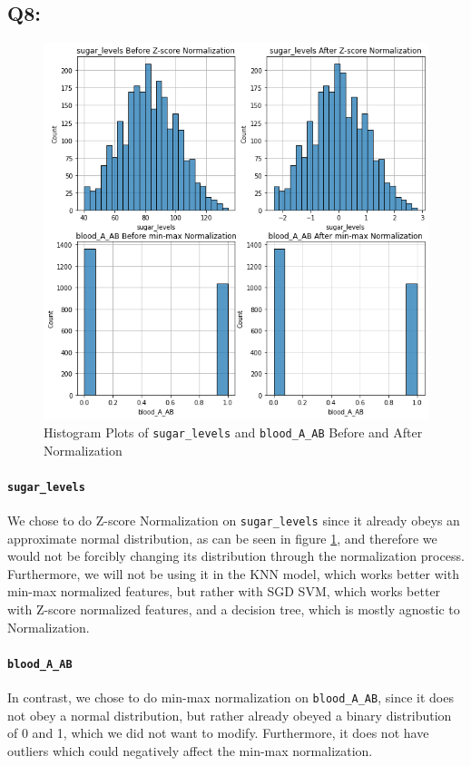 \documentclass{article}
\newcommand{\code}[1]{\texttt{#1}}
\begin{document}
\subsection*{Q8:}
    \begin{figure}[H]
        \centering
        \includegraphics[scale=0.5]{q8_hists.png}
        \caption{Histogram Plots of \code{sugar\_levels} and \code{blood\_A\_AB} Before and After Normalization}
        \label{fig:q8_hist}
    \end{figure}
    \paragraph*{\code{sugar\_levels}}
    We chose to do Z-score Normalization on \code{sugar\_levels} since it already obeys an approximate normal distribution, as can be seen in figure \ref{fig:q8_hist}, and therefore we would not be forcibly changing its distribution through the normalization process. Furthermore, we will not be using it in the KNN model, which works better with  min-max normalized features, but rather with SGD SVM, which works better with Z-score normalized features, and a decision tree, which is mostly agnostic to Normalization.
    \paragraph*{\code{blood\_A\_AB}}
     In contrast, we chose to do min-max normalization on \code{blood\_A\_AB}, since it does not obey a normal distribution, but rather already obeyed a binary distribution of 0 and 1, which we did not want to modify. Furthermore, it does not have outliers which could negatively affect the min-max normalization.
\end{document}
